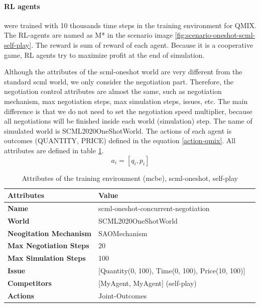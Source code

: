\paragraph{RL agents} were trained with 10 thousands time steps in the training environment for QMIX. The RL-agents are named as M* in the scenario image \ref{fig:scenario-oneshot-scml-self-play}. The reward is sum of reward of each agent. Because it is a cooperative game, RL agents try to maximize profit at the end of simulation.

Although the attributes of the scml-oneshot world are very different from the standard scml world, we only consider the negotiation part. Therefore, the negotiation control attributes are almost the same, such as negotiation mechanism, max negotiation steps, max simulation steps, issues, etc.
The main difference is that we do not need to set the negotiation speed multiplier, because all negotiations will be finished inside each world (simulation) step. The name of simulated world is SCML2020OneShotWorld. The actions of each agent is outcomes (QUANTITY, PRICE) defined in the equation \ref{action-qmix}. All attributes are defined in table \ref{tab:attributes-mcbe-concurrent-negotiation-scml-oneshot}.
\begin{equation} \label{action-qmix}
a_{i} = [q_i, p_i]
\end{equation}

\begin{table}[htbp]
\centering
\begin{tabular}{l l l} \toprule
\bfseries \textbf{Attributes}    & \bfseries \textbf{Value}                                             \\ \midrule
\textbf{Name}                    & scml-oneshot-concurrent-negotiation                                  \\
\textbf{World}                   & SCML2020OneShotWorld                                                 \\
\textbf{Neogitation Mechanism}   & SAOMechanism                                                         \\
\textbf{Max Negotiation Steps}   & 20                                                                  \\
\textbf{Max Simulation Steps}    & 100                                                                   \\
\textbf{Issue}             	     & [Quantity(0, 100), Time(0, 100), Price(10, 100)]                     \\
\textbf{Competitors}             & [MyAgent, MyAgent] (self-play)                                       \\
\textbf{Actions}                 & Joint-Outcomes                                                             \\
\bottomrule
\end{tabular}
\caption{Attributes of the training environment (mcbe), scml-oneshot, self-play}
\label{tab:attributes-mcbe-concurrent-negotiation-scml-oneshot}
\end{table}

